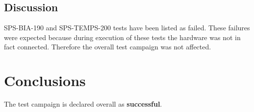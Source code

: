 \subsection{Discussion}
SPS-BIA-190 and SPS-TEMPS-200 tests have been listed as failed. 
These failures were expected because during execution of these tests the hardware was not in fact connected.
Therefore the overall test campaign was not affected.

\section{Conclusions}

The test campaign is declared overall as {\bf successful}.